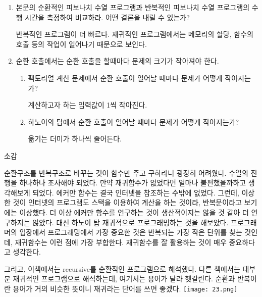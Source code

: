 \documentclass[11pt,a4paper]{article}
\begin{document}
\begin{enumerate}
\begin{enumerate}
\begin{lstlisting}
	\end{lstlisting}
\end{enumerate}
	
\item 본문의 순환적인 피보나치 수열 프로그램과 반복적인 피보나치 수열 프로그램의 수행 시간을 측정하여 비교하라. 어떤 결론을 내릴 수 있는가? 

반복적인 프로그램이 더 빠르다. 재귀적인 프로그램에서는 메모리의 할당, 함수의 호출 등의 작업이 일어나기 때문으로 보인다.

\item 순환 호출에서는 순환 호출을 할때마다 문제의 크기가 작아져야 한다.
\begin{enumerate}
	\item 팩토리얼 계산 문제에서 순환 호출이 일어날 때마다 문제가 어떻게 작아지는가?
	
	계산하고자 하는 입력값이 1씩 작아진다.
	\item 하노이의 탑에서 순환 호출이 일어날 때마다 문제가 어떻게 작아지는가?
	
	옮기는 더미가 하나씩 줄어든다.
\end{enumerate}


\end{enumerate}


\vspace{2cm}
{\Huge 소감}

순환구조를 반복구조로 바꾸는 것이 함수만 주고 구하라니 굉장히 어려웠다. 수열의 진행을 하나하나 조사해야 되었다. 만약 재귀함수가 없었다면 얼마나 불편했을까하고 생각해보게 되었다. 에커만 함수는 결국 인터넷을 참조하는 수밖에 없었다. 그런데, 이상한 것이 인터넷의 프로그램도 스택을 이용하여 계산을 하는 것이라, 반복문이라고 보기에는 이상했다. 더 이상 에커만 함수를 연구하는 것이 생산적이지는 않을 것 같아 더 연구하지는 않았다. 대신 하노이 탑 재귀적으로 프로그래밍하는 것을 해보았다. 프로그래머의 입장에서 프로그래밍에서 가장 중요한 것은 반복되는 가장 작은 단위를 찾는 것인데, 재귀함수는 이런 점에 가장 부합한다. 재귀함수를 잘 활용하는 것이 매우 중요하다고 생각한다.

그리고, 이책에서는 recursive를 순환적인 프로그램으로 해석했다. 다른 책에서는 대부분 재귀적인 프로그램으로 해석하는데, 여기서는 용어가 달라 헷갈린다. 순환과 반복이란 용어가 거의 비슷한 뜻이니 재귀라는 단어를 쓰면 좋겠다.
\newpage
\texttt{[image: 23.png]}
\end{document}
